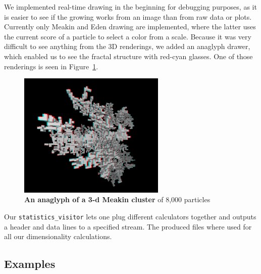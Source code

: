 \documentclass[twocolumn,10pt]{scrartcl}
\begin{document}
                We implemented real-time drawing in the beginning for debugging purposes, as it is easier to see if the
                growing works from an image than from raw data or plots. Currently only Meakin and Eden drawing are
                implemented, where the latter uses the current score of a particle to select a color from a scale.
                Because it was very difficult to see anything from the 3D renderings, we added an anaglyph drawer, which
                enabled us to see the fractal structure with red-cyan glasses. One of those renderings is seen in
                Figure~\ref{fig-anaglyph}.
                \begin{figure}
                    \center
                    \includegraphics[width=7cm]{img/anaglyph.png}
                    \caption[An anaglyph of a 3-d Meakin cluster]
                        {\small\textbf{An anaglyph of a 3-d Meakin cluster} of 8,000 particles}
                    \label{fig-anaglyph}
                \end{figure}

                Our \lstinline'statistics_visitor' lets one plug different calculators together and outputs a header and
                data lines to a specified stream. The produced files where used for all our dimensionality calculations.

        \subsection{Examples}
\end{document}
